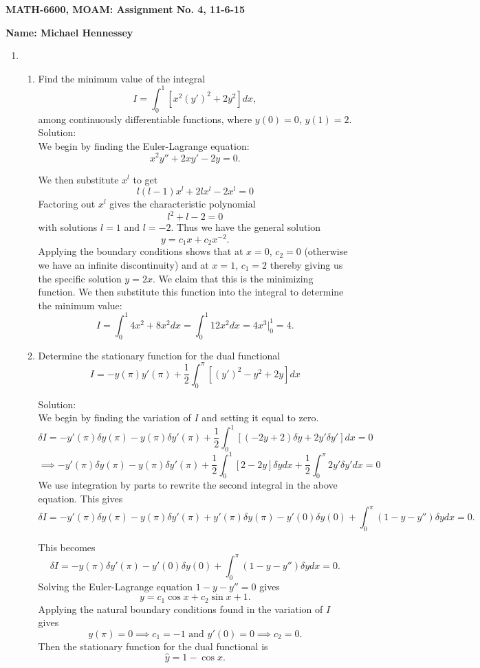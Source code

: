 \documentclass[12pt]{article}
\numberwithin{equation}{section}
\begin{document}
{\large\bf MATH-6600, MOAM: Assignment No. 4, 11-6-15}



\vspace{6 ex}

{\bf Name: Michael Hennessey} \hfill

\vspace{6 ex}

\begin{enumerate}
\item \begin{enumerate} \item Find the minimum value of the integral
$$I=\int_0^1[x^2(y')^2+2y^2]dx,$$
among continuously differentiable functions, where $y(0)=0$, $y(1)=2.$\\

Solution:\\

We begin by finding the Euler-Lagrange equation:
$$x^2 y''+2xy'-2y=0.$$

We then substitute $x^l$ to get
$$l(l-1)x^l+2lx^l-2x^l=0$$
Factoring out $x^l$ gives the characteristic polynomial
$$l^2+l-2=0$$
with solutions $l=1$ and $l=-2$. Thus we have the general solution
$$y=c_1x+c_2x^{-2}.$$
Applying the boundary conditions shows that at $x=0$, $c_2=0$ (otherwise we have an infinite discontinuity) and at $x=1$, $c_1=2$ thereby giving us the specific solution $y=2x$. We claim that this is the minimizing function. We then substitute this function into the integral to determine the minimum value:
$$I=\int_0^1 4x^2+8x^2dx=\int_0^1 12x^2dx=4x^3|_0^1=4.$$

\item Determine the stationary function for the dual functional
$$I=-y(\pi)y'(\pi)+\frac{1}{2}\int_0^\pi[(y')^2-y^2+2y]dx$$

Solution:\\

We begin by finding the variation of $I$ and setting it equal to zero.
$$\delta I=-y'(\pi)\delta y(\pi)-y(\pi)\delta y'(\pi)+\frac{1}{2}\int_0^1 [(-2y+2)\delta y+2y'\delta y']dx=0$$
$$\implies -y'(\pi)\delta y(\pi)-y(\pi)\delta y'(\pi)+\frac{1}{2}\int_0^1 [2-2y]\delta y dx+\frac{1}{2}\int_0^\pi 2y'\delta y' dx=0$$
We use integration by parts to rewrite the second integral in the above equation. This gives
$$\delta I= -y'(\pi)\delta y(\pi)-y(\pi)\delta y'(\pi)+y'(\pi)\delta y(\pi)-y'(0)\delta y(0)+\int_0^\pi(1-y-y'')\delta y dx=0.$$

This becomes
$$\delta I=-y(\pi)\delta y'(\pi)-y'(0)\delta y(0)+\int_0^\pi(1-y-y'')\delta y dx=0.$$
Solving the Euler-Lagrange equation $1-y-y''=0$ gives
$$y=c_1\cos x+c_2\sin x+1.$$
Applying the natural boundary conditions found in the variation of $I$ gives
$$y(\pi)=0\implies c_1=-1\text{ and }y'(0)=0\implies c_2=0.$$
Then the stationary function for the dual functional is
$$\hat{y}=1-\cos x.$$
\end{enumerate}


\end{enumerate}
\end{document}

